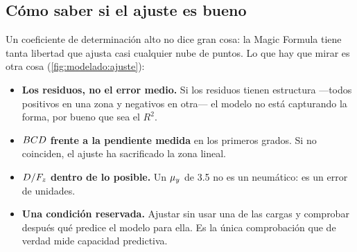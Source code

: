 \subsection{Cómo saber si el ajuste es bueno}

Un coeficiente de determinación alto no dice gran cosa: la Magic Formula tiene
tanta libertad que ajusta casi cualquier nube de puntos. Lo que hay que mirar es
otra cosa (\cref{fig:modelado:ajuste}):

\begin{itemize}
  \item \textbf{Los residuos, no el error medio.} Si los residuos tienen
        estructura ---todos positivos en una zona y negativos en otra--- el
        modelo no está capturando la forma, por bueno que sea el $R^2$.
  \item \textbf{$BCD$ frente a la pendiente medida} en los primeros
        grados. Si no coinciden, el ajuste ha sacrificado la zona lineal.
  \item \textbf{$D/F_z$ dentro de lo posible.} Un $\mu_y$ de \num{3.5} no es un
        neumático: es un error de unidades.
  \item \textbf{Una condición reservada.} Ajustar sin usar una de las cargas y
        comprobar después qué predice el modelo para ella. Es la única
        comprobación que de verdad mide capacidad predictiva.
\end{itemize}

